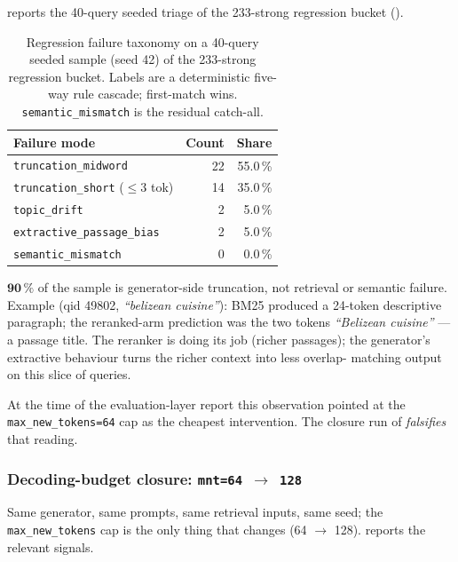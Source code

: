 \documentclass[11pt,a4paper]{article}
\newcommand{\bmtwofive}{BM25}
\begin{document}
 reports the 40-query seeded triage of the
233-strong regression bucket ().

\begin{table}[H]
  \centering
  \caption{Regression failure taxonomy on a 40-query seeded
  sample (seed 42) of the 233-strong regression bucket.  Labels are
  a deterministic five-way rule cascade; first-match wins.
  \texttt{semantic\_mismatch} is the residual catch-all.}
  \label{tab:w6-taxonomy}
  \begin{tabular}{lrr}
    \toprule
    Failure mode                & Count & Share \\
    \midrule
    \texttt{truncation\_midword}      & 22 & 55.0\,\% \\
    \texttt{truncation\_short} ($\leq\!3$ tok) & 14 & 35.0\,\% \\
    \texttt{topic\_drift}             &  2 &  5.0\,\% \\
    \texttt{extractive\_passage\_bias} & 2 &  5.0\,\% \\
    \texttt{semantic\_mismatch}       &  0 &  0.0\,\% \\
    \bottomrule
  \end{tabular}
\end{table}

$\mathbf{90\,\%}$ of the sample is generator-side truncation, not
retrieval or semantic failure.  Example (qid 49802,
\emph{``belizean cuisine''}): \bmtwofive{} produced a 24-token
descriptive paragraph; the reranked-arm prediction was the two
tokens \emph{``Belizean cuisine''} --- a passage title.  The
reranker is doing its job (richer passages); the generator's
extractive behaviour turns the richer context into less overlap-
matching output on this slice of queries.

At the time of the evaluation-layer report this observation pointed at the
\texttt{max\_new\_tokens=64} cap as the cheapest intervention.  The
closure run of  \emph{falsifies} that reading.

\subsubsection{Decoding-budget closure: \texttt{mnt=64 $\to$ 128}}
\label{sec:w6-closure}

Same generator, same prompts, same retrieval inputs, same seed; the
\texttt{max\_new\_tokens} cap is the only thing that changes
(64 $\to$ 128).   reports the relevant signals.
\end{document}
